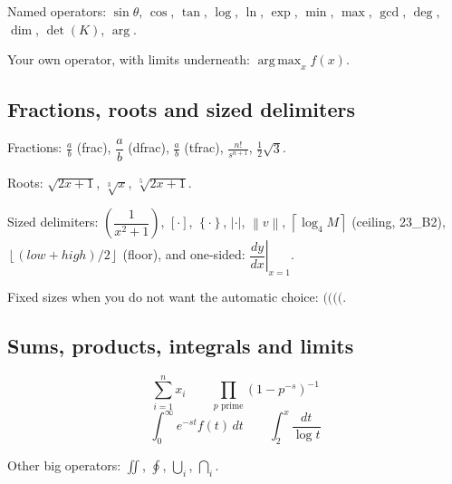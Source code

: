 \documentclass[11pt,a4paper]{article}
\DeclareMathOperator*{\argmax}{arg\,max}
\theoremstyle{definition}                   %
\begin{document}
Named operators: $\sin\theta$, $\cos$, $\tan$, $\log$, $\ln$, $\exp$, $\min$,
$\max$, $\gcd$, $\deg$, $\dim$, $\det(K)$, $\arg$.

Your own operator, with limits underneath: $\argmax_{x} f(x)$.

\subsection{Fractions, roots and sized delimiters}

Fractions: $\frac{a}{b}$ (frac), $\dfrac{a}{b}$ (dfrac), $\tfrac{a}{b}$ (tfrac),
$\frac{n!}{s^{n+1}}$, $\frac{1}{2}\sqrt{3}$.

Roots: $\sqrt{2x+1}$, $\sqrt[3]{x}$, $\sqrt[5]{2x+1}$.

Sized delimiters:
$\left( \dfrac{1}{x^2+1} \right)$,
$\left[ \cdot \right]$,
$\left\{ \cdot \right\}$,
$\left| \cdot \right|$,
$\left\| v \right\|$,
$\left\lceil \log_4 M \right\rceil$ (ceiling, 23\_B2),
$\left\lfloor (\mathit{low}+\mathit{high})/2 \right\rfloor$ (floor),
and one-sided: $\left. \dfrac{dy}{dx} \right|_{x=1}$.

Fixed sizes when you do not want the automatic choice:
$\big( \Big( \bigg( \Bigg($.

\subsection{Sums, products, integrals and limits}

\[ \sum_{i=1}^{n} x_i \qquad \prod_{p \text{ prime}} \left(1 - p^{-s}\right)^{-1} \]
\[ \int_{0}^{\infty} e^{-st} f(t)\,dt \qquad \int_{2}^{x} \frac{dt}{\log t} \]

Other big operators: $\iint$, $\oint$, $\bigcup_{i}$, $\bigcap_{i}$.
\end{document}
